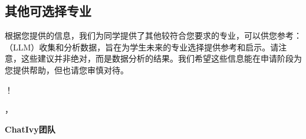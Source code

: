 \documentclass[12pt]{article}
\begin{document}
\begin{CJK*}{UTF8}{gbsn}
   
   
   
   \newpage
   \hspace{0pt}
   \vspace{0cm}
   \subsection*{其他可选择专业}
   根据您提供的信息，我们为同学提供了其他较符合您要求的专业，可以供您参考：
   \bigskip
   \bigskip
   \bigskip
   （LLM）收集和分析数据，旨在为学生未来的专业选择提供参考和启示。请注意，这些建议并非绝对，而是数据分析的结果。我们希望这些信息能在申请阶段为您提供帮助，但也请您审慎对待。

   \bigskip 
   ！

   ，

   \noindent\textbf{ChatIvy团队}

\printbibliography
\clearpage\end{CJK*}
\end{document}
